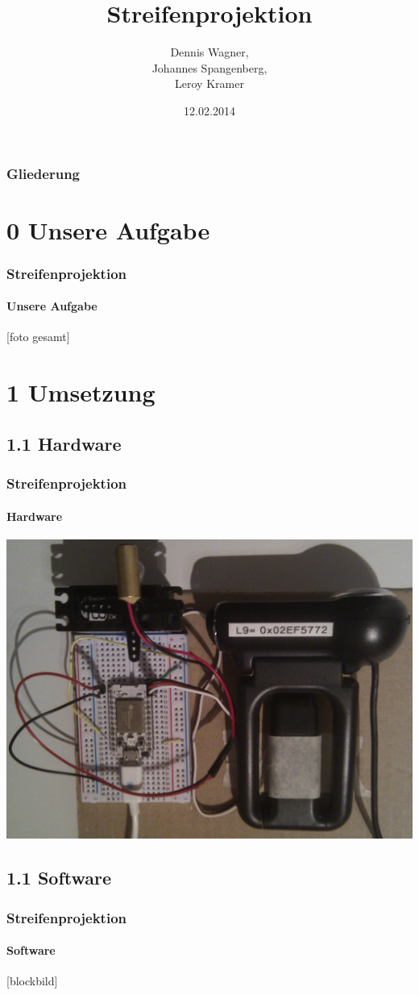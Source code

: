 \documentclass{beamer}
\title{Streifenprojektion}
\author{Dennis Wagner, \\ Johannes Spangenberg, \\ Leroy Kramer}
\date{12.02.2014}
\begin{document}
\frame{\titlepage} 


\begin{frame}
	\frametitle{Gliederung}
	\tableofcontents
\end{frame} 


\section{0 \hspace{5px} Unsere Aufgabe} 
\begin{frame}
	\frametitle{Streifenprojektion}
	\framesubtitle{Unsere Aufgabe}
	[foto gesamt]
	
\end{frame}


\section{1 \hspace{5px} Umsetzung} 
\subsection{1.1 \hspace{5px} Hardware}
\begin{frame}
	\frametitle{Streifenprojektion}
	\framesubtitle{Hardware}
	\includegraphics[width=\linewidth]{includes/hardware.jpg}
	
\end{frame}


\subsection{1.1 \hspace{5px} Software}
\begin{frame}
	\frametitle{Streifenprojektion}
	\framesubtitle{Software}
	[blockbild]
	
\end{frame}
\end{document}
